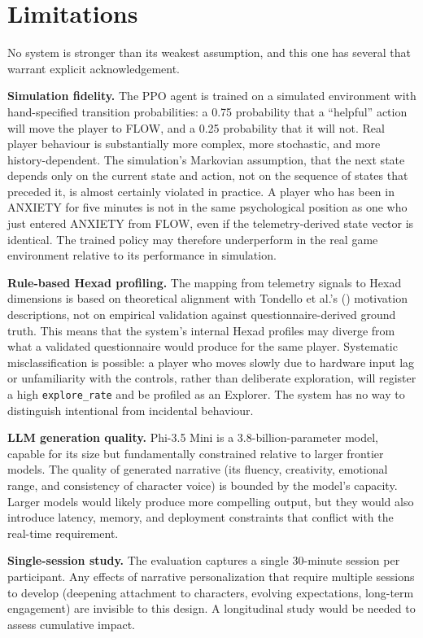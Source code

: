 \section{Limitations}

No system is stronger than its weakest assumption, and this one has several that warrant explicit acknowledgement.

\textbf{Simulation fidelity.} The PPO agent is trained on a simulated environment with hand-specified transition probabilities: a 0.75 probability that a ``helpful'' action will move the player to FLOW, and a 0.25 probability that it will not. Real player behaviour is substantially more complex, more stochastic, and more history-dependent. The simulation's Markovian assumption, that the next state depends only on the current state and action, not on the sequence of states that preceded it, is almost certainly violated in practice. A player who has been in ANXIETY for five minutes is not in the same psychological position as one who just entered ANXIETY from FLOW, even if the telemetry-derived state vector is identical. The trained policy may therefore underperform in the real game environment relative to its performance in simulation.

\textbf{Rule-based Hexad profiling.} The mapping from telemetry signals to Hexad dimensions is based on theoretical alignment with Tondello et al.'s (\citeyear{tondello2016hexad}) motivation descriptions, not on empirical validation against questionnaire-derived ground truth. This means that the system's internal Hexad profiles may diverge from what a validated questionnaire would produce for the same player. Systematic misclassification is possible: a player who moves slowly due to hardware input lag or unfamiliarity with the controls, rather than deliberate exploration, will register a high \texttt{explore\_rate} and be profiled as an Explorer. The system has no way to distinguish intentional from incidental behaviour.

\textbf{LLM generation quality.} Phi-3.5 Mini is a 3.8-billion-parameter model, capable for its size but fundamentally constrained relative to larger frontier models. The quality of generated narrative (its fluency, creativity, emotional range, and consistency of character voice) is bounded by the model's capacity. Larger models would likely produce more compelling output, but they would also introduce latency, memory, and deployment constraints that conflict with the real-time requirement.

\textbf{Single-session study.} The evaluation captures a single 30-minute session per participant. Any effects of narrative personalization that require multiple sessions to develop (deepening attachment to characters, evolving expectations, long-term engagement) are invisible to this design. A longitudinal study would be needed to assess cumulative impact.

